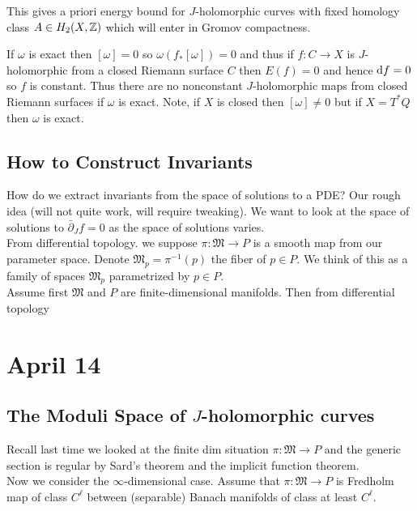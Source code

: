\documentclass[12pt]{article}
\newcommand{\dbar}{\bar{\partial}}
\begin{document}
\begin{rmk}
This gives a priori energy bound for $J$-holomorphic curves with fixed homology class $A \in H_2(X, \mathbb{Z})$ which will enter in Gromov compactness.  
\end{rmk}

\begin{rmk}
If $\omega$ is exact then $[\omega] = 0$ so $\omega(f_* [\omega]) = 0$ and thus if $f : C \to X$ is $J$-holomorphic from a closed Riemann surface $C$ then $E(f) = 0$ and hence $\mathrm{d}{f} = 0$ so $f$ is constant. Thus there are no nonconstant $J$-holomorphic maps from closed Riemann surfaces if $\omega$ is exact. Note, if $X$ is closed then $[\omega] \neq 0$ but if $X = T^* Q$ then $\omega$ is exact. 
\end{rmk}

\subsection{How to Construct Invariants}

\newcommand{\mf}[1]{\mathfrak{#1}}

How do we extract invariants from the space of solutions to a PDE? Our rough idea (will not quite work, will require tweaking). We want to look at the space of solutions to $\dbar_J f = 0$ as the space of solutions varies.
\bigskip\\
From differential topology. we suppose $\pi : \mf{M} \to P$ is a smooth map from our parameter space. Denote $\mf{M}_p = \pi^{-1}(p)$ the fiber of $p \in P$. We think of this as a family of spaces $\mf{M}_p$ parametrized by $p \in P$. 
\bigskip\\
Assume first $\mf{M}$ and $P$ are finite-dimensional manifolds. Then from differential topology  

\section{April 14}

\subsection{The Moduli Space of $J$-holomorphic curves}

Recall last time we looked at the finite dim situation $\pi : \mf{M} \to P$ and the generic section is regular by Sard's theorem and the implicit function theorem. 
\bigskip\\
Now we consider the $\infty$-dimensional case. Assume that $\pi : \mf{M} \to P$ is Fredholm map of class $C^\ell$ between (separable) Banach manifolds of class at least $C^\ell$.
\end{document}
